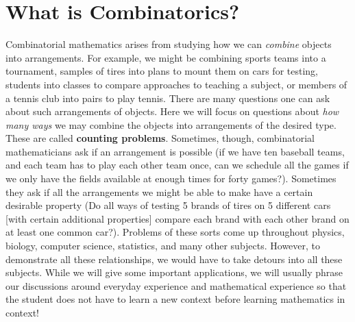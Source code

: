 \documentclass[10pt,]{book}
\newcommand{\terminology}[1]{\textbf{#1}}
\theoremstyle{plain}
\theoremstyle{definition}
\theoremstyle{definition}
\numberwithin{equation}{chapter}
\begin{document}
\setcounter{tocdepth}{2}
\renewcommand*\contentsname{Contents}
\tableofcontents
\mainmatter
\typeout{************************************************}
\typeout{************************************************}
\chapter[{What is Combinatorics?}]{What is Combinatorics?}\label{what-is}
Combinatorial mathematics arises from studying how we can \emph{combine} objects into arrangements. For example, we might be combining sports teams into a tournament, samples of tires into plans to mount them on cars for testing, students into classes to compare approaches to teaching a subject, or members of a tennis club into pairs to play tennis. There are many questions one can ask about such arrangements of objects. Here we will focus on questions about \emph{how many ways} we may combine the objects into arrangements of the desired type. These are called \terminology{counting problems}. Sometimes, though, combinatorial mathematicians ask if an arrangement is possible (if we have ten baseball teams, and each team has to play each other team once, can we schedule all the games if we only have the fields available at enough times for forty games?).  Sometimes they ask if all the arrangements we might be able to make have a certain desirable property (Do all ways of testing 5 brands of tires on 5 different cars [with certain additional properties] compare each brand with each other brand on at least one common car?). Problems of these sorts come up throughout physics, biology, computer science, statistics, and many other subjects. However, to demonstrate all these relationships, we would have to take detours into all these subjects. While we will give some important applications, we will usually phrase our discussions around everyday experience and mathematical experience so that the student does not have to learn a new context before learning mathematics in context!%
\typeout{************************************************}
\typeout{************************************************}
\end{document}
